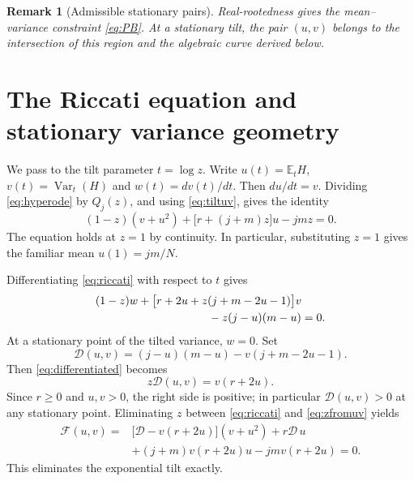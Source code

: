\documentclass[11pt,a4paper]{article}
\newtheorem{remark}[theorem]{Remark}
\DeclareMathOperator{\Var}{Var}\DeclareMathOperator{\Cov}{Cov}\DeclareMathOperator{\Hyp}{Hyp}\DeclareMathOperator{\Bern}{Bern}\DeclareMathOperator{\supp}{supp}\DeclareMathOperator{\artanh}{artanh}
\newcommand{\E}{\mathbb E}\newcommand{\R}{\mathbb R}\newcommand{\N}{\mathbb N}\newcommand{\one}{\mathbf1}
\begin{document}
\begin{remark}[Admissible stationary pairs]
Real-rootedness gives the mean--variance constraint \eqref{eq:PB}. At a stationary tilt, the pair $(u,v)$ belongs to the intersection of this region and the algebraic curve derived below.
\end{remark}

\section{The Riccati equation and stationary variance geometry}\label{sec:stationary}
We pass to the tilt parameter $t=\log z$. Write $u(t)=\E_tH$, $v(t)=\Var_t(H)$ and $w(t)=dv(t)/dt$. Then $du/dt=v$. Dividing \eqref{eq:hyperode} by $Q_j(z)$, and using \eqref{eq:tiltuv}, gives the identity
\begin{equation}\label{eq:riccati}
 \boxed{\ (1-z)(v+u^2)+\bigl[r+(j+m)z\bigr]u-jmz=0.\ }
\end{equation}
The equation holds at $z=1$ by continuity. In particular, substituting $z=1$ gives the familiar mean $u(1)=jm/N$.

Differentiating \eqref{eq:riccati} with respect to $t$ gives
\begin{align}\label{eq:differentiated}
 &(1-z)w+\bigl[r+2u+z(j+m-2u-1)\bigr]v\notag\\
 &\hspace{35mm}-z(j-u)(m-u)=0.
\end{align}
At a stationary point of the tilted variance, $w=0$. Set
\begin{equation}\label{eq:Dden}
 \mathcal D(u,v)=(j-u)(m-u)-v(j+m-2u-1).
\end{equation}
Then \eqref{eq:differentiated} becomes
\begin{equation}\label{eq:zfromuv}
 z\mathcal D(u,v)=v(r+2u).
\end{equation}
Since $r\ge0$ and $u,v>0$, the right side is positive; in particular $\mathcal D(u,v)>0$ at any stationary point. Eliminating $z$ between \eqref{eq:riccati} and \eqref{eq:zfromuv} yields
\begin{equation}\label{eq:F}
 \boxed{\begin{aligned}
 \mathcal F(u,v)={}&\bigl[\mathcal D-v(r+2u)\bigr](v+u^2)
 +r\mathcal D\,u\\
 &+(j+m)v(r+2u)u-jmv(r+2u)=0.
 \end{aligned}}
\end{equation}
This eliminates the exponential tilt exactly.
\end{document}
